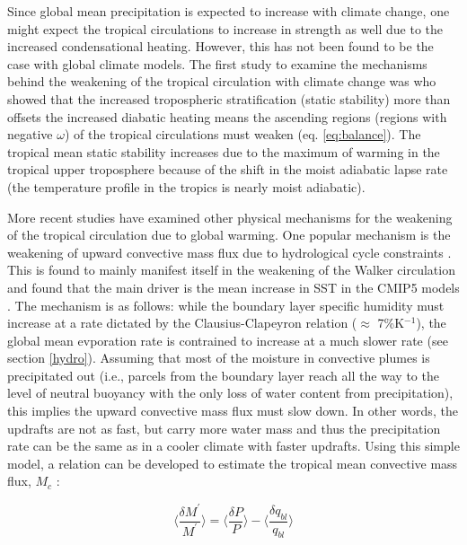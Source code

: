 \documentclass[letterpaper,12pt,titlepage,oneside,final]{book}
\begin{document}
Since global mean precipitation is expected to increase with climate change, one might expect the tropical circulations to increase in strength as well due to the increased condensational heating. However, this has not been found to be the case with global climate models. The first study to examine the mechanisms behind the weakening of the tropical circulation with climate change was \citep{knutson_time-mean_1995} who showed that the increased tropospheric stratification (static stability) more than offsets the increased diabatic heating means the ascending regions (regions with negative $\omega$) of the tropical circulations must weaken (eq. \ref{eq:balance}). The tropical mean static stability increases due to the maximum of warming in the tropical upper troposphere because of the shift in the moist adiabatic lapse rate (the temperature profile in the tropics is nearly moist adiabatic).

More recent studies have examined other physical mechanisms for the weakening of the tropical circulation due to global warming. One popular mechanism is the weakening of upward convective mass flux due to hydrological cycle constraints \citep{held_robust_2006,vecchi_global_2007,chadwick_spatial_2012}. This is found to mainly manifest itself in the weakening of the Walker circulation \citep{held_robust_2006,vecchi_global_2007} and \citep{he_anthropogenic_2015} found that the main driver is the mean increase in SST in the CMIP5 models \citep{taylor_overview_2011}. The mechanism is as follows: while the boundary layer specific humidity must increase at a rate dictated by the Clausius-Clapeyron relation ($\approx$ 7\%K$^{-1}$), the global mean evporation rate is contrained to increase at a much slower rate (see section \ref{hydro}). Assuming that most of the moisture in convective plumes is precipitated out (i.e., parcels from the boundary layer reach all the way to the level of neutral buoyancy with the only loss of water content from precipitation), this implies the upward convective mass flux must slow down. In other words, the updrafts are not as fast, but carry more water mass and thus the precipitation rate can be the same as in a cooler climate with faster updrafts. Using this simple model, a relation can be developed to estimate the tropical mean convective mass flux, 
$M_{c}$ \citep{held_robust_2006}:

\begin{equation}\label{eq:HS}
\Bigg\langle\frac{\delta{M^{'}}}{M^{'}}\Bigg\rangle=\Bigg\langle\frac{\delta{P}}{P}\Bigg\rangle-\Bigg\langle\frac{\delta{q_{bl}}}{q_{bl}}\Bigg\rangle
\end{equation}
\end{document}

